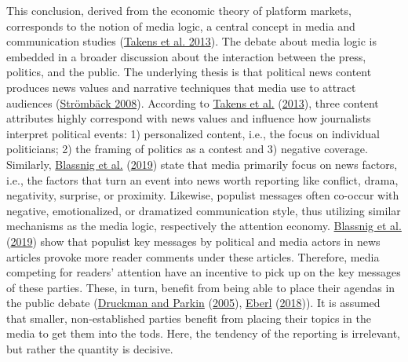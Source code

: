 \documentclass[
  12pt,
]{article}
\begin{document}
This conclusion, derived from the economic theory of platform markets,
corresponds to the notion of media logic, a central concept in media and
communication studies (\protect\hyperlink{ref-takens_media_2013}{Takens
et al. 2013}). The debate about media logic is embedded in a broader
discussion about the interaction between the press, politics, and the
public. The underlying thesis is that political news content produces
news values and narrative techniques that media use to attract audiences
(\protect\hyperlink{ref-stromback_four_2008}{Strömbäck 2008}). According
to \protect\hyperlink{ref-takens_media_2013}{Takens et al.}
(\protect\hyperlink{ref-takens_media_2013}{2013}), three content
attributes highly correspond with news values and influence how
journalists interpret political events: 1) personalized content, i.e.,
the focus on individual politicians; 2) the framing of politics as a
contest and 3) negative coverage. Similarly,
\protect\hyperlink{ref-blassnig_hitting_2019}{Blassnig et al.}
(\protect\hyperlink{ref-blassnig_hitting_2019}{2019}) state that media
primarily focus on news factors, i.e., the factors that turn an event
into news worth reporting like conflict, drama, negativity, surprise, or
proximity. Likewise, populist messages often co-occur with negative,
emotionalized, or dramatized communication style, thus utilizing similar
mechanisms as the media logic, respectively the attention economy.
\protect\hyperlink{ref-blassnig_hitting_2019}{Blassnig et al.}
(\protect\hyperlink{ref-blassnig_hitting_2019}{2019}) show that populist
key messages by political and media actors in news articles provoke more
reader comments under these articles. Therefore, media competing for
readers' attention have an incentive to pick up on the key messages of
these parties. These, in turn, benefit from being able to place their
agendas in the public debate
(\protect\hyperlink{ref-druckman_impact_2005}{Druckman and Parkin}
(\protect\hyperlink{ref-druckman_impact_2005}{2005}),
\protect\hyperlink{ref-eberl_lying_2018}{Eberl}
(\protect\hyperlink{ref-eberl_lying_2018}{2018})). It is assumed that
smaller, non-established parties benefit from placing their topics in
the media to get them into the tods. Here, the tendency of the reporting
is irrelevant, but rather the quantity is decisive.
\end{document}
